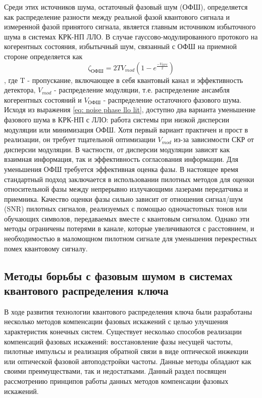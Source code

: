 Среди этих источников шума, остаточный фазовый шум (ОФШ), определяется как распределение разности между реальной фазой квантового сигнала и измеренной фазой принятого сигнала, является главным источником избыточного шума в системах КРК-НП ЛЛО. В случае гауссово-модулированного протокого на когерентных состояния, избытычный шум, связанный с ОФШ на приемной стороне определяется как 
\begin{equation}
    \zeta_{ОФШ} = 2TV_{mod}(1-e^\frac{-V_{RPN}}{2}) 
\end{equation}\label{eq: noise phase llo lit}, где T - пропускание, включающее в себя квантовый канал и эффективность детектора, $V_{mod}$ - распределение модуляции, т.е. распределение ансамбля когерентных состояний и $V_{ОФШ}$ - распределение остаточного фазового шума.
Исходя из выражения \ref{eq: noise phase llo lit}, доступно два варианта уменьшение фазового шума в КРК-НП с ЛЛО: работа системы при низкой дисперсии модуляции или минимизация ОФШ. Хотя первый вариант практичен и прост в реализации, он требует тщательной оптимизации $V_{mod}$ из-за зависимости СКР от дисперсии модуляции. В частности, от дисперсии модуляции зависят как взаимная информация, так и эффективность согласования информации.
Для уменьшения ОФШ требуется эффективная оценка фазы. В настоящее время стандартный подход заключается в использовании пилотных методов для оценки относительной фазы между непрерывно излучающими лазерами  передатчика и приемника. Качество оценки фазы сильно зависит от отношения сигнал/шум (SNR) пилотных сигналов, реализуемых с помощью одночастотных тонов или обучающих символов, передаваемых вместе с квантовым сигналом. Однако эти методы ограничены потерями в канале, которые увеличиваются с расстоянием, и необходимостью в маломощном пилотном сигнале для уменьшения перекрестных помех квантовому сигналу.

\subsection{Методы борьбы с фазовым шумом в системах квантового распределения ключа}\label{sec:ch1/sect5/subsec1}
В ходе развития технологии квантового распределения ключа были разработаны несколько методов компенсации фазовых искажений с целью улучшения характеристик конечных систем. Существует несколько способов реализации компенсаций фазовых искажений: восстановление фазы несущей частоты, пилотные импульсы и реализация обратной связи в виде оптической инжекции или оптической фазовой автоподстройки частоты. Данные методы обладают как своими преимуществами, так и недостатками. Данный раздел посвящен рассмотрению принципов работы данных методов компенсации фазовых искажений. 
